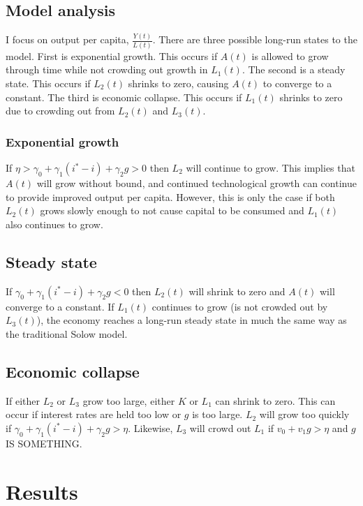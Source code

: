 \documentclass[12pt]{article}
\theoremstyle{definition}
\begin{document}
\subsection{Model analysis}

I focus on output per capita, \(\frac{Y(t)}{L(t)}\). There are three possible long-run states to the model.  First is exponential growth.  This occurs if \(A(t)\) is allowed to grow through time while not crowding out growth in \(L_1(t)\).  The second is a steady state.  This occurs if \(L_2(t)\) shrinks to zero, causing \(A(t)\) to converge to a constant.  The third is economic collapse.  This occurs if \(L_1(t)\) shrinks to zero due to crowding out from \(L_2(t)\) and \(L_3(t)\).  

\subsubsection{Exponential growth}
If \(\eta >\gamma_0+\gamma_1 (i^*-i)+\gamma_2 g > 0\) then \(L_2\) will continue to grow.  This implies that \(A(t)\) will grow without bound, and continued technological growth can continue to provide improved output per capita.  However, this is only the case if both \(L_2(t)\) grows slowly enough to not cause capital to be consumed and \(L_1(t)\) also continues to grow.  

\subsection{Steady state}
If \(\gamma_0+\gamma_1 (i^*-i)+\gamma_2 g <0\) then \(L_2(t)\) will shrink to zero and \(A(t)\) will converge to a constant.  If \(L_1(t)\) continues to grow (is not crowded out by \(L_3(t)\)), the economy reaches a long-run steady state in much the same way as the traditional Solow model.

\subsection{Economic collapse}
If either \(L_2\) or \(L_3\) grow too large, either \(K\) or \(L_1\) can shrink to zero.  This can occur if interest rates are held too low or \(g\) is too large.  \(L_2\) will grow too quickly if \(\gamma_0+\gamma_1 (i^*-i)+\gamma_2 g > \eta\).  Likewise, \(L_3\) will crowd out \(L_1\) if \(v_0+v_1g > \eta\) and \(g\) IS SOMETHING.

\section{Results}
\end{document}
